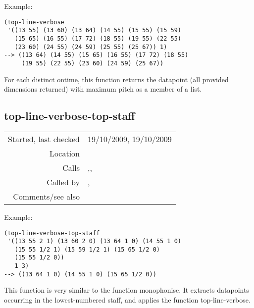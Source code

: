 \vspace{0.5cm}
\noindent Example:
\begin{verbatim}
(top-line-verbose
 '((13 55) (13 60) (13 64) (14 55) (15 55) (15 59)
   (15 65) (16 55) (17 72) (18 55) (19 55) (22 55)
   (23 60) (24 55) (24 59) (25 55) (25 67)) 1)
--> ((13 64) (14 55) (15 65) (16 55) (17 72) (18 55)
     (19 55) (22 55) (23 60) (24 59) (25 67))
\end{verbatim}

\noindent For each distinct ontime, this function
returns the datapoint (all provided dimensions
returned) with maximum pitch as a member of a list.


\subsection*{top-line-verbose-top-staff}\label{fun:top-line-verbose-top-staff}

\vspace{0.3cm}
\begin{tabular}{r|p{8cm}}
Started, last checked & 19/10/2009, 19/10/2009 \\
Location & \nameref{sec:musical-properties} \\
Calls & \nameref{fun:dataset-restricted-to-m-in-nth},\newline \nameref{fun:nth-list-of-lists}, \nameref{fun:restn} \\
Called by & \nameref{fun:intervallic-leaps}, \nameref{fun:small-intervals} \\
Comments/see also &
\end{tabular}

\vspace{0.5cm}
\noindent Example:
\begin{verbatim}
(top-line-verbose-top-staff
 '((13 55 2 1) (13 60 2 0) (13 64 1 0) (14 55 1 0)
   (15 55 1/2 1) (15 59 1/2 1) (15 65 1/2 0)
   (15 55 1/2 0))
   1 3)
--> ((13 64 1 0) (14 55 1 0) (15 65 1/2 0))
\end{verbatim}

\noindent This function is very similar to the
function monophonise. It extracts datapoints occurring
in the lowest-numbered staff, and applies the function
top-line-verbose.



























